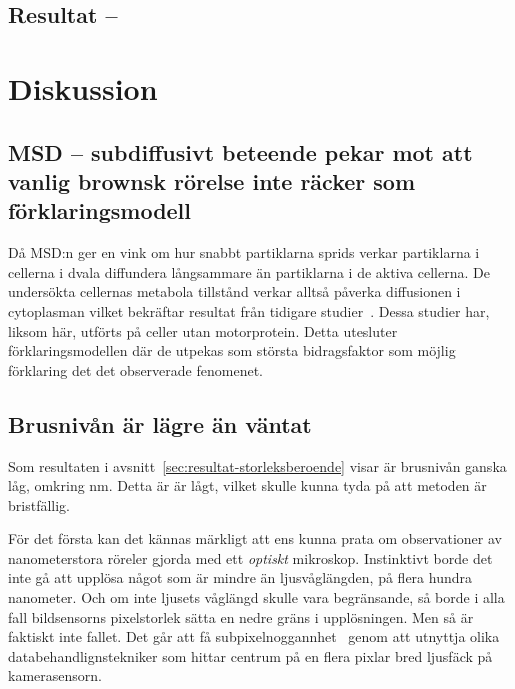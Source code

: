 \subsection{Resultat -- }


\section{Diskussion}


\subsection{MSD -- subdiffusivt beteende pekar mot att vanlig brownsk rörelse inte räcker som förklaringsmodell}
Då MSD:n ger en vink om hur snabbt partiklarna sprids verkar partiklarna i cellerna i dvala diffundera långsammare än partiklarna i de aktiva cellerna. De undersökta cellernas metabola tillstånd verkar alltså påverka diffusionen i cytoplasman vilket bekräftar resultat från tidigare studier~\cite{Parry_etal2014}. Dessa studier har, liksom här, utförts på celler utan motorprotein. Detta utesluter förklaringsmodellen där de utpekas som största bidragsfaktor som möjlig förklaring det det observerade fenomenet. 





\subsection{Brusnivån är lägre än väntat}
Som resultaten i avsnitt~\ref{sec:resultat-storleksberoende} visar är brusnivån ganska låg, omkring \unit[5]{nm}. Detta är är lågt, vilket skulle kunna tyda på att metoden är bristfällig.

För det första kan det kännas märkligt att ens kunna prata om observationer av nanometerstora röreler gjorda med ett \emph{optiskt} mikroskop. Instinktivt borde det inte gå att upplösa något som är mindre än ljusvåglängden, på flera hundra nanometer. Och om inte ljusets våglängd skulle vara begränsande, så borde i alla fall bildsensorns pixelstorlek sätta en nedre gräns i upplösningen. Men så är faktiskt inte fallet. Det går att få subpixelnoggannhet~\cite{Saunter2010} genom att utnyttja olika databehandlignstekniker som hittar centrum på en flera pixlar bred ljusfäck på kamerasensorn.

